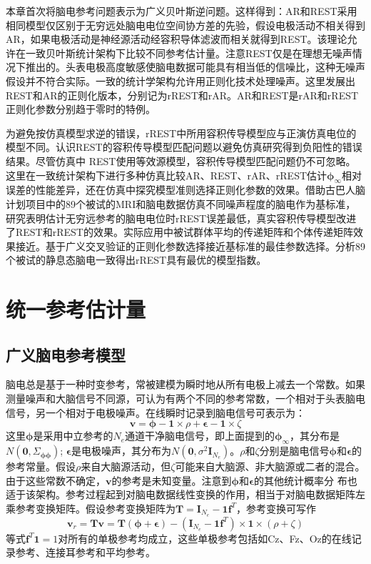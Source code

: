 本章首次将脑电参考问题表示为广义贝叶斯逆问题。这样得到：AR和REST采用相同模型仅区别于无穷远处脑电电位空间协方差的先验，假设电极活动不相关得到AR，如果电极活动是神经源活动经容积导体滤波而相关就得到REST。该理论允许在一致贝叶斯统计架构下比较不同参考估计量。注意REST仅是在理想无噪声情况下推出的。头表电极高度敏感使脑电数据可能具有相当低的信噪比，这种无噪声假设并不符合实际。一致的统计学架构允许用正则化技术处理噪声。这里发展出REST和AR的正则化版本，分别记为rREST和rAR。AR和REST是rAR和rREST正则化参数分别趋于零时的特例。

为避免按仿真模型求逆的错误，rREST中所用容积传导模型应与正演仿真电位的模型不同。认识REST的容积传导模型匹配问题以避免仿真研究得到负阳性的错误结果。尽管仿真中
REST使用等效源模型，容积传导模型匹配问题仍不可忽略。这里在一致统计架构下进行多种仿真比较AR、REST、rAR、rREST估计$\mathbf{\phi}_\infty$相对误差的性能差异，还在仿真中探究模型准则选择正则化参数的效果。借助古巴人脑计划项目中的89个被试的MRI和脑电数据仿真不同噪声程度的脑电作为基标准，研究表明估计无穷远参考的脑电电位时rREST误差最低，真实容积传导模型改进了REST和rREST的效果。实际应用中被试群体平均的传递矩阵和个体传递矩阵效果接近。基于广义交叉验证的正则化参数选择接近基标准的最佳参数选择。分析89个被试的静息态脑电一致得出rREST具有最优的模型指数。

\section{统一参考估计量}
\subsection{广义脑电参考模型}
脑电总是基于一种时变参考，常被建模为瞬时地从所有电极上减去一个常数。如果测量噪声和大脑信号不同源，可认为有两个不同的参考常数，一个相对于头表脑电信号，另一个相对于电极噪声。在线瞬时记录到脑电信号可表示为：
\begin{equation}\label{eq3.1}
\mathbf{v}=\mathbf{\phi}-\mathbf{1}\times\rho+\mathbf{\epsilon}-\mathbf{1}\times\zeta
\end{equation}
这里$\mathbf{\phi}$是采用中立参考的$N_e$通道干净脑电信号，即上面提到的$\mathbf{\phi}_{\infty}$，其分布是$N(\mathbf{0},\Sigma_{\mathbf{\phi}\mathbf{\phi}})$; $\mathbf{\epsilon}$是电极噪声，其分布为$N(\mathbf{0},\sigma^{2}\mathbf{I}_{N_{e}})$。$\rho$和$\zeta$分别是脑电信号$\mathbf{\phi}$和$\mathbf{\epsilon}$的参考常量。假设$\rho$来自大脑源活动，但$\zeta$可能来自大脑源、非大脑源或二者的混合。由于这些常数不确定，$\mathbf{v}$的参考是未知变量。注意到$\mathbf{\phi}$和$\mathbf{\epsilon}$的其他统计概率分
布也适于该架构。参考过程起到对脑电数据线性变换的作用，相当于对脑电数据矩阵左乘参考变换矩阵。假设参考变换矩阵为$\mathbf{T}=\mathbf{I}_{N_e}-\mathbf{1f}^T$，参考变换可写作
\begin{equation*}
\mathbf{v}_{r}=\mathbf{Tv}=\mathbf{T(\phi+\epsilon)}-(\mathbf{I}_{N_e}-\mathbf{1f}^T)\times\mathbf{1}\times(\rho+\zeta)
\end{equation*}
等式$\mathbf{f}^T\mathbf{1}=1$对所有的单极参考均成立，这些单极参考包括如Cz、Fz、Oz的在线记录参考、连接耳参考和平均参考。

